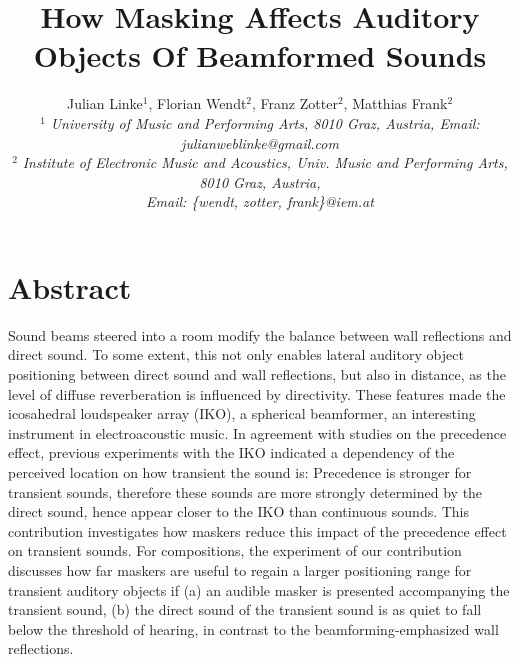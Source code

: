 \documentclass[a4paper, 10pt, twocolumn]{article}
\begin{document}
\date{}                                         %

\title{\vspace{-8mm}\textbf{\large
How Masking Affects Auditory Objects Of Beamformed Sounds}}

\author{
Julian Linke$^1$, Florian Wendt$^2$, Franz Zotter$^2$, Matthias Frank$^2$\\
$^1$ \emph{\small University of Music and Performing Arts, 8010 Graz, Austria, Email: julianweblinke@gmail.com}\\
$^2$ \emph{\small Institute of Electronic Music and Acoustics, Univ. Music and Performing Arts, 8010 Graz, Austria,}\\
\emph{\small Email: \{wendt, zotter, frank\}@iem.at}} \maketitle
\thispagestyle{empty}           %
\section*{Abstract}
\label{sec:Abstract} 
Sound beams steered into a room modify the balance between wall reflections and direct sound. To some extent, this not only enables lateral auditory object positioning between direct sound and wall reflections, but also in distance, as the level of diffuse reverberation is influenced by directivity. These features made the icosahedral loudspeaker array (IKO), a spherical beamformer, an interesting instrument in electroacoustic music.
In agreement with studies on the precedence effect, previous experiments with the IKO indicated a dependency of the perceived location on how transient the sound is:  Precedence is stronger for transient sounds, therefore these sounds are more strongly determined by the direct sound, hence appear closer to the IKO than continuous sounds.
This contribution investigates how maskers reduce this impact of the precedence effect on transient sounds. For compositions, the experiment of our contribution discusses how far maskers are useful to regain a larger positioning range for transient auditory objects if (a) an audible masker is presented accompanying the transient sound, (b) the direct sound of the transient sound is as quiet to fall below the threshold of hearing, in contrast to the beamforming-emphasized wall reflections.
\end{document}
